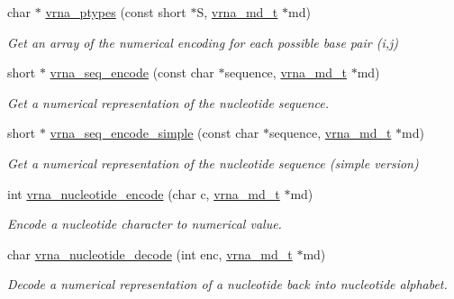 \begin{DoxyCompactItemize}
\item 
char $\ast$ \hyperlink{group__utils_ga51a9e86a5f731f5f2f5584ee67cee4a8}{vrna\+\_\+ptypes} (const short $\ast$S, \hyperlink{group__model__details_ga1f8a10e12a0a1915f2a4eff0b28ea17c}{vrna\+\_\+md\+\_\+t} $\ast$md)
\begin{DoxyCompactList}\small\item\em Get an array of the numerical encoding for each possible base pair (i,j) \end{DoxyCompactList}\item 
short $\ast$ \hyperlink{group__utils_ga636e7d6f888fd639587296a5eddea660}{vrna\+\_\+seq\+\_\+encode} (const char $\ast$sequence, \hyperlink{group__model__details_ga1f8a10e12a0a1915f2a4eff0b28ea17c}{vrna\+\_\+md\+\_\+t} $\ast$md)\hypertarget{group__utils_ga636e7d6f888fd639587296a5eddea660}{}\label{group__utils_ga636e7d6f888fd639587296a5eddea660}

\begin{DoxyCompactList}\small\item\em Get a numerical representation of the nucleotide sequence. \end{DoxyCompactList}\item 
short $\ast$ \hyperlink{group__utils_ga3cd79d21d53248ad2634c1c0d43e97d7}{vrna\+\_\+seq\+\_\+encode\+\_\+simple} (const char $\ast$sequence, \hyperlink{group__model__details_ga1f8a10e12a0a1915f2a4eff0b28ea17c}{vrna\+\_\+md\+\_\+t} $\ast$md)\hypertarget{group__utils_ga3cd79d21d53248ad2634c1c0d43e97d7}{}\label{group__utils_ga3cd79d21d53248ad2634c1c0d43e97d7}

\begin{DoxyCompactList}\small\item\em Get a numerical representation of the nucleotide sequence (simple version) \end{DoxyCompactList}\item 
int \hyperlink{group__utils_gac12bf00123f88621c9be847b0879c1fb}{vrna\+\_\+nucleotide\+\_\+encode} (char c, \hyperlink{group__model__details_ga1f8a10e12a0a1915f2a4eff0b28ea17c}{vrna\+\_\+md\+\_\+t} $\ast$md)
\begin{DoxyCompactList}\small\item\em Encode a nucleotide character to numerical value. \end{DoxyCompactList}\item 
char \hyperlink{group__utils_ga48ef585e697be9c8a08ed68c655e29b6}{vrna\+\_\+nucleotide\+\_\+decode} (int enc, \hyperlink{group__model__details_ga1f8a10e12a0a1915f2a4eff0b28ea17c}{vrna\+\_\+md\+\_\+t} $\ast$md)
\begin{DoxyCompactList}\small\item\em Decode a numerical representation of a nucleotide back into nucleotide alphabet. \end{DoxyCompactList}\end{DoxyCompactItemize}
